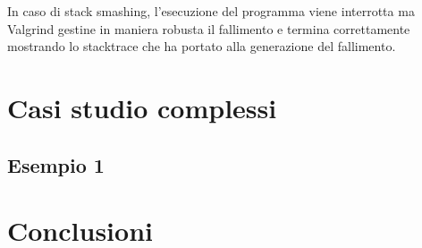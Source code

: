 \documentclass{article}
\begin{document}
In caso di stack smashing, l'esecuzione del programma viene interrotta ma
Valgrind gestine in maniera robusta il fallimento e termina correttamente
mostrando lo stacktrace che ha portato alla generazione del fallimento.


\newpage
\section{Casi studio complessi}

\subsection{Esempio 1}
\label{sec:complesso1}


\section{Conclusioni}
\end{document}
